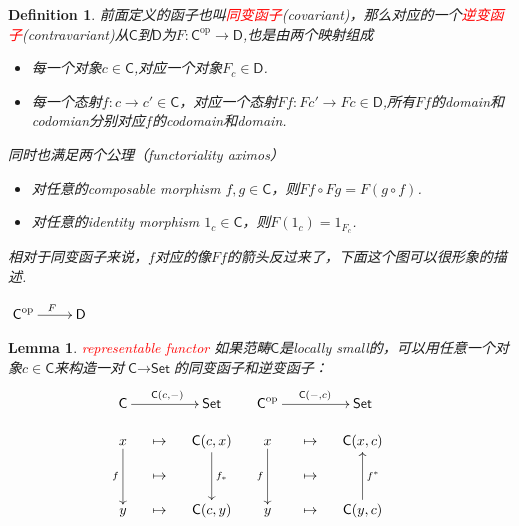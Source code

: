 \documentclass{article}
\newtheorem{lemma}[theorem]{Lemma}
\newtheorem{definition}[theorem]{Definition}
\newcommand*{\cat}[1]{\textsf{#1}\xspace}
\newcommand{\Set}{\textsf{Set}\xspace}
\newcommand{\op}{\textrm{op}}
\newcommand{\redt}[1]{\textcolor{red}{#1}}
\begin{document}
\begin{definition}
\rm 前面定义的函子也叫\redt{同变函子}(covariant)，那么对应的一个\redt{逆变函子}(contravariant)从$\cat{C}$到$\cat{D}$为$F: \cat{C}^{\op} \rightarrow \cat{D} $,也是由两个映射组成
\begin{itemize}
	\item 每一个对象$c \in \cat{C}$,对应一个对象$F_c \in \cat{D}$.
	\item 每一个态射$f \colon c \rightarrow	c' \in \cat{C}$，对应一个态射$Ff \colon Fc' \rightarrow Fc \in \cat{D}$,所有$Ff$的domain和codomian分别对应$f$的codomain和domain.
\end{itemize}
同时也满足两个公理（functoriality aximos）
\begin{itemize}
	\item 对任意的composable morphism $f,g \in \cat{C}$，则$Ff \circ Fg = F(g \circ f)$.
	\item 对任意的identity morphism $1_c \in \cat{C}$，则$F(1_c)=1_{F_c}$.
\end{itemize}
相对于同变函子来说，$f$对应的像$Ff$的箭头反过来了，下面这个图可以很形象的描述.
\begin{center}
$\xymatrix{\cat{C}^{\op}\ar[r]^F&\cat{D}}$ \\
\end{center} 
\end{definition}	

\begin{lemma}
\rm \redt{representable functor}  如果范畴$\cat{C}$是locally small的，可以用任意一个对象$c \in \cat{C}$来构造一对$\cat{C} \to \Set$的同变函子和逆变函子：
\[
	\xymatrix@-1pc{
	\cat{C}\ar[rr]^{\cat{C}(c,-)} & & \Set & \cat{C}^\op \ar^{\cat{C}(-,c)}[rr] & & \Set \\
	x\ar[dd]_{f} & \mapsto & \cat{C}(c,x)\ar[dd]^{f_*} & x\ar[dd]_{f} & \mapsto & \cat{C}(x,c) \\
	  &\mapsto & & & \mapsto & &\\
	y & \mapsto & \cat{C}(c,y) & y & \mapsto & \cat{C}(y,c)\ar[uu]_{f^*} \\
	}
	\]
\end{lemma}
\end{document}
